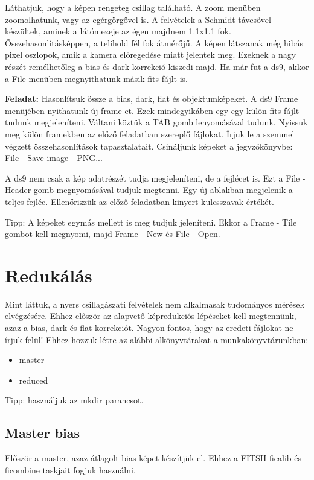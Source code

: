 \documentclass{article}
\begin{document}
Láthatjuk, hogy a képen rengeteg csillag található. A zoom menüben zoomolhatunk,
vagy az egérgörgővel is. A felvételek a Schmidt távcsővel készültek, aminek a
látómezeje az égen majdnem 1.1x1.1 fok. Összehasonlításképpen, a telihold fél
fok átmérőjű.
A képen látszanak még hibás pixel oszlopok, amik a kamera elöregedése miatt
jelentek meg. Ezeknek a nagy részét remélhetőleg a bias és dark korrekció
kiszedi majd.
Ha már fut a ds9, akkor a File menüben megnyithatunk másik fits fájlt is.

{\bf Feladat:}
Hasonlítsuk össze a bias, dark, flat és objektumképeket.
A ds9 Frame menüjében nyithatunk új frame-et. Ezek mindegyikáben egy-egy külön
fits fájlt tudunk megjeleníteni. Váltani köztük a TAB gomb lenyomásával tudunk.
Nyissuk meg külön framekben az előző feladatban szereplő fájlokat. Írjuk le a
szemmel végzett összehasonlítások tapasztalatait. Csináljunk képeket a
jegyzőkönyvbe:
File - Save image - PNG...

A ds9 nem csak a kép adatrészét tudja megjeleníteni, de a fejlécet is. Ezt a
File - Header gomb megnyomásával tudjuk megtenni. Egy új ablakban megjelenik a
teljes fejléc. Ellenőrizzük az előző feladatban kinyert kulcsszavak értékét.

Tipp: A képeket egymás mellett is meg tudjuk jeleníteni. Ekkor a Frame - Tile
gombot kell megnyomi, majd Frame - New és File - Open.

\section{Redukálás}

Mint láttuk, a nyers csillagászati felvételek nem alkalmasak tudományos mérések
elvégzésére. Ehhez először az alapvető képredukciós lépéseket kell megtennünk,
azaz a bias, dark és flat korrekciót.
Nagyon fontos, hogy az eredeti fájlokat ne írjuk felül!
Ehhez hozzuk létre az alábbi alkönyvtárakat a munkakönyvtárunkban:
\begin{itemize}
  \item master
  \item reduced
\end{itemize}
Tipp: használjuk az mkdir parancsot.

\subsection{Master bias}
Először a master, azaz átlagolt bias képet készítjük el. Ehhez a FITSH ficalib
és ficombine taskjait fogjuk használni.
\end{document}
